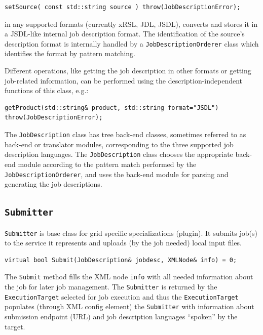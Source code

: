 \documentclass{book}
\newcommand{\ExecutionTarget}{\texttt{ExecutionTarget}}
\newcommand{\Submitter}{\texttt{Submitter}}
\newcommand{\JobDescription}{\texttt{JobDescription}}
\begin{document}
\begin{shaded}
\begin{verbatim}
setSource( const std::string source ) throw(JobDescriptionError);
\end{verbatim}
\end{shaded}

in any supported formats (currently xRSL, JDL, JSDL), converts and stores it in a JSDL-like internal job description format. The identification 
of the source's description format is internally handled by a \texttt{JobDescriptionOrderer} class which identifies the format by pattern
matching.

Different operations, like getting the job description in other formats or getting job-related information, can be performed using the 
description-independent functions of this class, e.g.:

\begin{shaded}
\begin{verbatim}
getProduct(std::string& product, std::string format="JSDL") throw(JobDescriptionError);
\end{verbatim}
\end{shaded}

The {\JobDescription} class has tree back-end classes, sometimes referred to as back-end or translator modules, corresponding to the three 
supported job description languages. The {\JobDescription} class chooses the appropriate back-end module according to the pattern match 
performed by the \texttt{JobDescriptionOrderer}, and uses the back-end module for parsing and generating the job descriptions.

\subsection{{\Submitter}} {\Submitter} is base class for grid specific specializations (plugin). It submits job(s) to the service 
it represents and uploads (by the job needed) local input files. 

\begin{shaded}
\begin{verbatim}
virtual bool Submit(JobDescription& jobdesc, XMLNode& info) = 0;
\end{verbatim}
\end{shaded}

The \texttt{Submit} method fills the XML node \texttt{info} with all needed information about the job for later job management. 
The {\Submitter} is returned by the {\ExecutionTarget} selected for job execution and thus the {\ExecutionTarget} populates 
(through XML config element) the {\Submitter} with information about submission endpoint (URL) and job description languages 
``spoken'' by the target.
\end{document}
